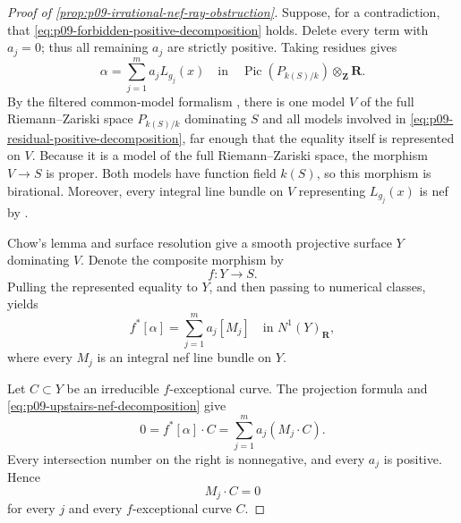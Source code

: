 \begin{proof}[Proof of \cref{prop:p09-irrational-nef-ray-obstruction}]
Suppose, for a contradiction, that
\eqref{eq:p09-forbidden-positive-decomposition} holds.  Delete every term
with \(a_j=0\); thus all remaining \(a_j\) are strictly positive.  Taking
residues gives
\begin{equation}
\label{eq:p09-residual-positive-decomposition}
                 \alpha=\sum_{j=1}^{m}a_jL_{g_j}(x)
 \quad\text{in}\quad
 \operatorname{Pic}(P_{k(S)/k})\otimes_{\mathbf Z}\mathbf R.
\end{equation}
By the filtered common-model formalism
\cite[\S\S6.2, 6.6 and Lemma~6.5]{GJR26}, there is one model \(V\) of
the full Riemann--Zariski space \(P_{k(S)/k}\) dominating \(S\) and all
models involved in \eqref{eq:p09-residual-positive-decomposition}, far
enough that the equality itself is represented on \(V\).  Because it is a
model of the full Riemann--Zariski space, the morphism \(V\to S\) is proper.
Both models have function field \(k(S)\), so this morphism is birational.
Moreover, every integral line bundle on \(V\) representing
\(L_{g_j}(x)\) is nef by \cite[Lemma~6.11]{GJR26}.

Chow's lemma \cite[Tag~02O2]{stacks-project} and surface resolution
\cite[Tag~0BGP]{stacks-project} give a smooth projective surface \(Y\)
dominating \(V\).  Denote the composite morphism by
\[
                              f:Y\longrightarrow S.
\]
Pulling the represented equality to \(Y\), and then passing to numerical
classes, yields
\begin{equation}
\label{eq:p09-upstairs-nef-decomposition}
                       f^*[\alpha]=\sum_{j=1}^{m}a_j[M_j]
              \quad\text{in }N^1(Y)_{\mathbf R},
\end{equation}
where every \(M_j\) is an integral nef line bundle on \(Y\).

Let \(C\subset Y\) be an irreducible \(f\)-exceptional curve.  The
projection formula and \eqref{eq:p09-upstairs-nef-decomposition} give
\[
 0=f^*[\alpha]\cdot C
   =\sum_{j=1}^{m}a_j(M_j\cdot C).
\]
Every intersection number on the right is nonnegative, and every \(a_j\)
is positive.  Hence
\begin{equation}
\label{eq:p09-exceptional-orthogonality}
                              M_j\cdot C=0
\end{equation}
for every \(j\) and every \(f\)-exceptional curve \(C\).


\end{proof}
